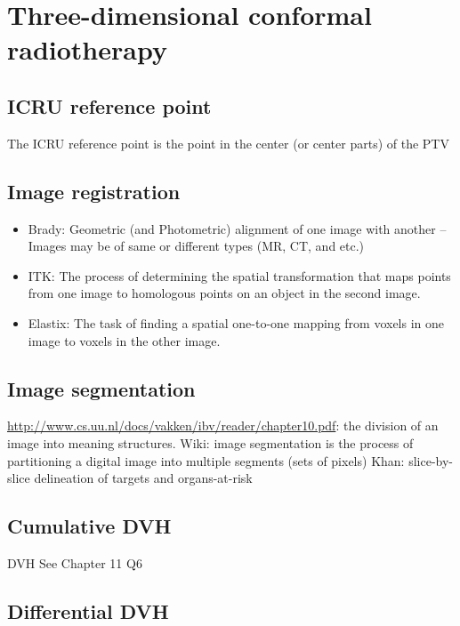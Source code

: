 \documentclass[]{book}
\providecommand{\tightlist}{%
  \setlength{\itemsep}{0pt}\setlength{\parskip}{0pt}}
\theoremstyle{definition}
\theoremstyle{definition}
\theoremstyle{definition}
\theoremstyle{remark}
\begin{document}
\chapter{Three-dimensional conformal radiotherapy}\label{crt}

\section{ICRU reference point}\label{icru-reference-point}

The ICRU reference point is the point in the center (or center parts) of
the PTV

\section{Image registration}\label{image-registration}

\begin{itemize}
\tightlist
\item
  Brady: Geometric (and Photometric) alignment of one image with another
  -- Images may be of same or different types (MR, CT, and etc.)
\item
  ITK: The process of determining the spatial transformation that maps
  points from one image to homologous points on an object in the second
  image.
\item
  Elastix: The task of finding a spatial one-to-one mapping from voxels
  in one image to voxels in the other image.
\end{itemize}

\section{Image segmentation}\label{image-segmentation}

\url{http://www.cs.uu.nl/docs/vakken/ibv/reader/chapter10.pdf}: the
division of an image into meaning structures. Wiki: image segmentation
is the process of partitioning a digital image into multiple segments
(sets of pixels) Khan: slice-by-slice delineation of targets and
organs-at-risk

\section{Cumulative DVH}\label{cumulative-dvh}

DVH See Chapter 11 Q6

\section{Differential DVH}\label{differential-dvh}
\end{document}
